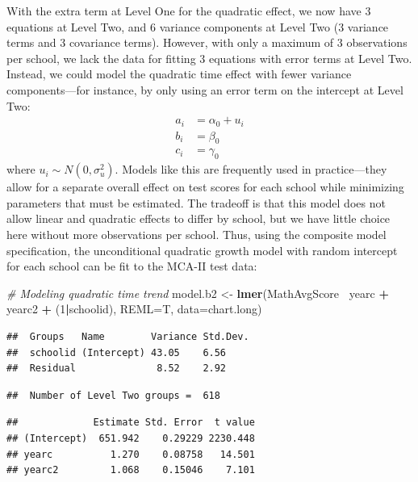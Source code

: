 \documentclass[
]{krantz}
\newenvironment{Shaded}{\begin{snugshade}}{\end{snugshade}}
\newcommand{\CommentTok}[1]{\textcolor[rgb]{0.37,0.37,0.37}{\textit{#1}}}
\newcommand{\DataTypeTok}[1]{\textcolor[rgb]{0.27,0.27,0.27}{#1}}
\newcommand{\DecValTok}[1]{\textcolor[rgb]{0.06,0.06,0.06}{#1}}
\newcommand{\KeywordTok}[1]{\textcolor[rgb]{0.27,0.27,0.27}{\textbf{#1}}}
\newcommand{\NormalTok}[1]{#1}
\newcommand{\OperatorTok}[1]{\textcolor[rgb]{0.43,0.43,0.43}{\textbf{#1}}}
\newcommand{\StringTok}[1]{\textcolor[rgb]{0.5,0.5,0.5}{#1}}
\begin{document}
With the extra term at Level One for the quadratic effect, we now have 3 equations at Level Two, and 6 variance components at Level Two (3 variance terms and 3 covariance terms). However, with only a maximum of 3 observations per school, we lack the data for fitting 3 equations with error terms at Level Two. Instead, we could model the quadratic time effect with fewer variance components---for instance, by only using an error term on the intercept at Level Two:\\
\begin{align*}
a_{i} & = \alpha_{0} + u_{i}\\
b_{i} & = \beta_{0}\\ 
c_{i} & = \gamma_{0}
\end{align*}
where \(u_{i}\sim N(0,\sigma^2_u)\). Models like this are frequently used in practice---they allow for a separate overall effect on test scores for each school while minimizing parameters that must be estimated. The tradeoff is that this model does not allow linear and quadratic effects to differ by school, but we have little choice here without more observations per school. Thus, using the composite model specification, the unconditional quadratic growth model with random intercept for each school can be fit to the MCA-II test data:

\begin{Shaded}
\begin{Highlighting}[]
\CommentTok{# Modeling quadratic time trend}
\NormalTok{model.b2 <-}\StringTok{ }\KeywordTok{lmer}\NormalTok{(MathAvgScore}\OperatorTok{~}\StringTok{ }\NormalTok{yearc }\OperatorTok{+}\StringTok{ }\NormalTok{yearc2 }\OperatorTok{+}\StringTok{ }\NormalTok{(}\DecValTok{1}\OperatorTok{|}\NormalTok{schoolid), }
  \DataTypeTok{REML=}\NormalTok{T, }\DataTypeTok{data=}\NormalTok{chart.long)}
\end{Highlighting}
\end{Shaded}

\begin{verbatim}
##  Groups   Name        Variance Std.Dev.
##  schoolid (Intercept) 43.05    6.56    
##  Residual              8.52    2.92
\end{verbatim}

\begin{verbatim}
##  Number of Level Two groups =  618
\end{verbatim}

\begin{verbatim}
##             Estimate Std. Error  t value
## (Intercept)  651.942    0.29229 2230.448
## yearc          1.270    0.08758   14.501
## yearc2         1.068    0.15046    7.101
\end{verbatim}
\end{document}
